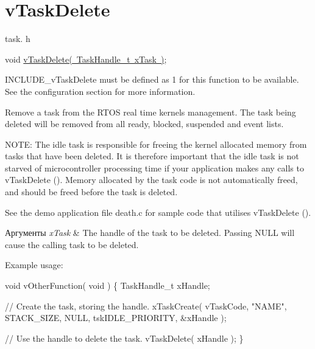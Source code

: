 \hypertarget{group__v_task_delete}{}\section{v\+Task\+Delete}
\label{group__v_task_delete}
task. h 
\begin{DoxyPre}void \mbox{\hyperlink{task_8h_a27ff4ebce26565bef136bda84201ff80}{vTaskDelete( TaskHandle\_t xTask )}};\end{DoxyPre}


I\+N\+C\+L\+U\+D\+E\+\_\+v\+Task\+Delete must be defined as 1 for this function to be available. See the configuration section for more information.

Remove a task from the R\+T\+OS real time kernel\textquotesingle{}s management. The task being deleted will be removed from all ready, blocked, suspended and event lists.

N\+O\+TE\+: The idle task is responsible for freeing the kernel allocated memory from tasks that have been deleted. It is therefore important that the idle task is not starved of microcontroller processing time if your application makes any calls to v\+Task\+Delete (). Memory allocated by the task code is not automatically freed, and should be freed before the task is deleted.

See the demo application file death.\+c for sample code that utilises v\+Task\+Delete ().


\begin{DoxyParams}{Аргументы}
{\em x\+Task} & The handle of the task to be deleted. Passing N\+U\+LL will cause the calling task to be deleted.\\
\hline
\end{DoxyParams}
Example usage\+: 
\begin{DoxyPre}
void vOtherFunction( void )
\{
TaskHandle\_t xHandle;\end{DoxyPre}



\begin{DoxyPre}    // Create the task, storing the handle.
    xTaskCreate( vTaskCode, "NAME", STACK\_SIZE, NULL, tskIDLE\_PRIORITY, \&xHandle );\end{DoxyPre}



\begin{DoxyPre}    // Use the handle to delete the task.
    vTaskDelete( xHandle );
\}
  \end{DoxyPre}
 